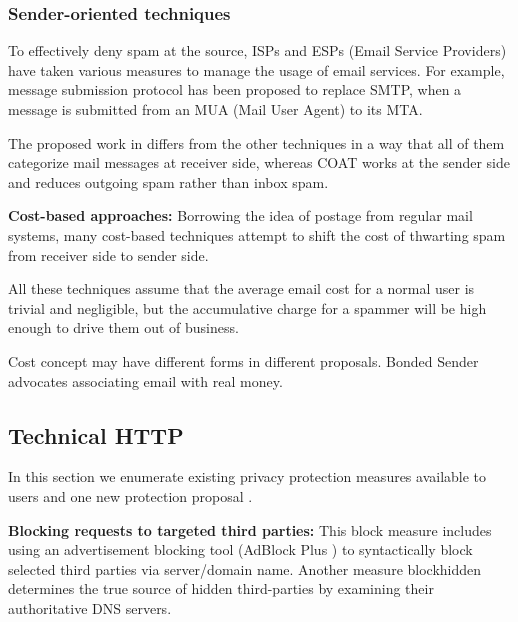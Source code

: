 \subsubsection{Sender-oriented techniques}

To effectively deny spam at the source,
	ISPs and ESPs (Email Service Providers) have taken various measures to manage the usage of email services.
For example,
	message submission protocol \cite{BibEntry1998Dec} has been proposed to replace SMTP,
	when a message is submitted from an MUA (Mail User Agent) to its MTA.

The proposed work in \cite{ahmad_coat_2012} differs from the other techniques in a way that all of them categorize mail messages at receiver side,
	whereas COAT works at the sender side and reduces outgoing spam rather than inbox spam.

\textbf{Cost-based approaches:} Borrowing the idea of postage from regular mail systems,
	many cost-based techniques attempt to shift the cost of thwarting spam from receiver side to sender side.

All these techniques assume that the average email cost for a normal user is trivial and negligible,
	but the accumulative charge for a spammer will be high enough to drive them out of business.

Cost concept may have different forms in different proposals.
Bonded Sender \cite{BibEntry2018May} advocates associating email with real money.

\subsection{Technical HTTP}

In this section we enumerate existing privacy protection measures available to users and one new protection proposal \cite{mayer-do-not-track-00}.

\textbf{Blocking requests to targeted third parties:}
This block measure includes using an advertisement blocking tool (AdBlock Plus \cite{adblockplus}) to syntactically block selected third parties via server/domain name.
Another measure blockhidden \cite{krishnamurthy_privacy_2009} determines the true source of hidden third-parties by examining their authoritative DNS servers.

